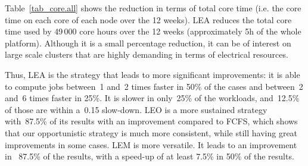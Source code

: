 \documentclass[conference]{IEEEtran}
\begin{document}
Table~\ref{tab_core.all} shows the reduction in terms of total core time (i.e. the core time on each core of each node over the 12 weeks). 
LEA reduces the total core time used by 49\,000 core hours over the 12 weeks (approximately 5h of the whole platform).
Although it is a small percentage reduction, it can be of interest on large scale clusters that are highly demanding in terms of electrical resources.


Thus, LEA is the strategy that leads to more significant improvements: it is able to compute jobs between~1 and~2 times faster in 50\% of the cases and between~2 and~6 times faster in 25\%.
It is slower in only~25\% of the workloads, and~12.5\% of those are within a~0.15 slow-down.
LEO is a more sustained strategy with~87.5\% of its results with an improvement compared to FCFS, which shows that our opportunistic
strategy is much more consistent, while still having great improvements in some cases.
LEM is more versatile. It leads to an improvement in ~87.5\% of the results, with a speed-up of at least 7.5\% in 50\% of the results.
\end{document}
